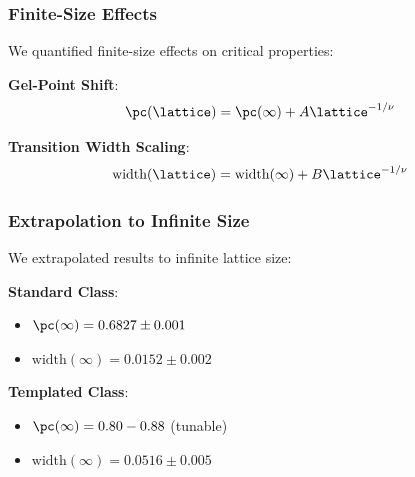 \subsubsection{Finite-Size Effects}
We quantified finite-size effects on critical properties:

\textbf{Gel-Point Shift}:
\begin{equation}
\pc(\lattice) = \pc(\infty) + A \lattice^{-1/\nu}
\end{equation}

\textbf{Transition Width Scaling}:
\begin{equation}
\text{width}(\lattice) = \text{width}(\infty) + B \lattice^{-1/\nu}
\end{equation}

\subsubsection{Extrapolation to Infinite Size}
We extrapolated results to infinite lattice size:

\textbf{Standard Class}:
\begin{itemize}
    \item $\pc(\infty) = 0.6827 \pm 0.001$
    \item $\text{width}(\infty) = 0.0152 \pm 0.002$
\end{itemize}

\textbf{Templated Class}:
\begin{itemize}
    \item $\pc(\infty) = 0.80-0.88$ (tunable)
    \item $\text{width}(\infty) = 0.0516 \pm 0.005$
\end{itemize}
